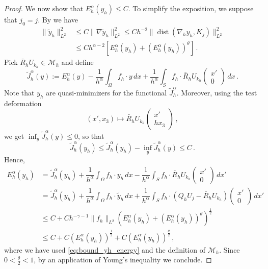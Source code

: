 \documentclass[10pt,a4paper]{amsart}
\DeclareMathOperator{\dist}{dist}
\begin{document}
\begin{proof}
	We now show that $E_h^\alpha(y_h) \leq C$. To simplify the exposition, we suppose that $j_0 = j$. By  we have
	\begin{equation}\label{eq:bound_yh_energy}
		\begin{aligned}
			\|\tilde y_h\|_{L^2}^2 & \leq C \|\nabla \tilde y_h\|_{L^2}^2 \leq Ch^{-2} \|\dist(\nabla_h y_h, K_j)\|^2_{L^2}\\
			& \leq Ch^{\alpha-2}[E_h^{\alpha}(y_h) + (E_h^{\alpha}(y_h))^\theta] \,.
		\end{aligned}
	\end{equation}
	Pick $\bar R_h U_{k_h} \in \mathcal{M}_h$ and define
	\[
	\tilde J^\alpha_h(y) := E^{\alpha}_h(y) - \dfrac{1}{h^\alpha} \int_\Omega f_h \cdot y \, dx + \dfrac{1}{h^\alpha} \int_S f_h \cdot \bar R_h U_{k_h} \begin{pmatrix}
	x' \\ 0
	\end{pmatrix} \, dx \,.
	\]
	Note that $y_h$ are quasi-minimizers for the functional $\tilde J_h^\alpha$. Moreover, using the test deformation
	\[
		(x', x_3) \mapsto \bar R_h U_{k_h}\begin{pmatrix}
		x' \\ hx_3
		\end{pmatrix} \,,
	\]
	we get $\inf_y \tilde J_h^\alpha(y) \leq 0$, so that
	\[
		\tilde J_h^\alpha(y_h) \leq \tilde J_h^{\alpha}(y_h) - \inf_y \tilde J_h^\alpha(y) \leq C \,.
	\]
	Hence,
	\begin{align}
	E_h^\alpha(y_h) & = \tilde J^\alpha_h(y_h) + \dfrac{1}{h^\alpha} \int_\Omega f_h \cdot y_h \, dx - \dfrac{1}{h^\alpha} \int_S f_h \cdot \bar R_h U_{k_h} \begin{pmatrix}
	x' \\ 0
	\end{pmatrix} \, dx' \\
	& = \tilde J^\alpha_h(y_h) + \dfrac{1}{h^\alpha} \int_\Omega f_h \cdot \tilde y_h \, dx + \dfrac{1}{h^\alpha} \int_S f_h \cdot (Q_h U_j  - \bar R_h U_{k_h}) \begin{pmatrix}
	x' \\ 0
	\end{pmatrix} \, dx'\\
	& \leq C + Ch^{-\gamma -1}\|f_h\|_{L^2}(E_h^{\alpha}(y_h) + (E_h^\alpha(y_h))^\theta )^{\frac{1}{2}}\\
	& \leq C + C(E_h^\alpha(y_h))^\frac{1}{2} + C(E_h^\alpha(y_h))^\frac{\theta}{2}\,,
	\end{align}
	where we have used \eqref{eq:bound_yh_energy} and the definition of $\mathcal{M}_h$.
	Since $0 < \frac{\theta}{2} < 1$, by an application of Young's inequality we conclude.
\end{proof}
\end{document}
